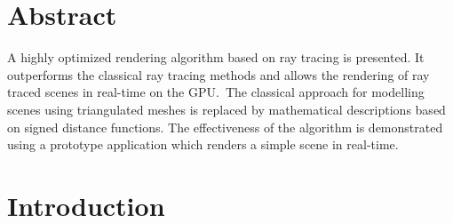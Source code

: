 \documentclass[%
    a4paper,    %
    justified,  %
    nobib,      %
    openany     %
]{tufte-book}
\begin{document}
\chapter*{Abstract}
\label{chap:abstract}

A highly optimized rendering algorithm based on ray
tracing is presented. It outperforms the classical ray tracing methods and
allows the rendering of ray traced scenes in real-time on the GPU.~The
classical approach for modelling scenes using triangulated meshes is replaced
by mathematical descriptions based on signed distance functions. The
effectiveness of the algorithm is demonstrated using a prototype application
which renders a simple scene in real-time.


\tableofcontents{}
\listoffigures{}
\listoftables{}

\newpage{}

\chapter{Introduction}
\label{chap:introduction}
\end{document}
